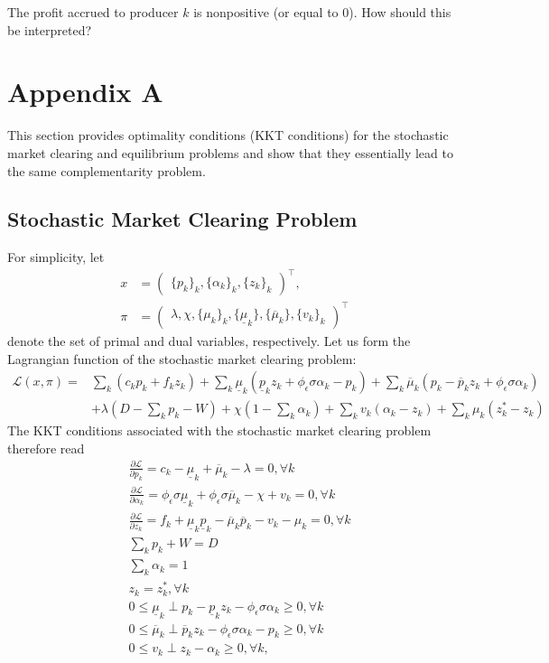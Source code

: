 \documentclass{article}
\begin{document}
The profit accrued to producer $k$ is nonpositive (or equal to 0). How should this be interpreted?

\section{Appendix A}
This section provides optimality conditions (KKT conditions) for the stochastic market clearing and equilibrium problems and show that they essentially lead to the same complementarity problem.
\subsection{Stochastic Market Clearing Problem}
For simplicity, let 
\begin{align*}
x &= \begin{pmatrix} \{p_k\}_k, \{\alpha_k\}_k, \{z_k\}_k \end{pmatrix}^\top,\\
\pi &= \begin{pmatrix} \lambda, \chi, \{\mu_k\}_k, \{\underline{\mu}_k\}, \{\overline{\mu}_k\}, \{v_k\}_k \end{pmatrix}^\top
\end{align*}
denote the set of primal and dual variables, respectively. Let us form the Lagrangian function of the stochastic market clearing problem:
\begin{align*}
\mathcal{L}(x, \pi) =& \sum_k (c_k p_k + f_k z_k) + \sum_k \underline{\mu}_k (\underline{p}_k z_k + \phi_{\epsilon} \sigma \alpha_k - p_k) + \sum_k \overline{\mu}_k (p_k - \overline{p}_k z_k + \phi_{\epsilon} \sigma \alpha_k)\\
& + \lambda(D - \sum_k p_k - W) + \chi(1 - \sum_k \alpha_k) + \sum_k v_k (\alpha_k - z_k) + \sum_k \mu_k(z_k^*- z_k)
\end{align*}
The KKT conditions associated with the stochastic market clearing problem therefore read
\begin{align*}
&\frac{\partial \mathcal{L}}{\partial p_k} = c_k - \underline{\mu}_k + \overline{\mu}_k - \lambda = 0, \forall k\\
&\frac{\partial \mathcal{L}}{\partial \alpha_k} = \phi_{\epsilon} \sigma \underline{\mu}_k + \phi_{\epsilon} \sigma \overline{\mu}_k - \chi + v_k = 0, \forall k\\
&\frac{\partial \mathcal{L}}{\partial z_k} = f_k + \underline{\mu}_k \underline{p}_k - \overline{\mu}_k \overline{p}_k - v_k - \mu_k = 0, \forall k\\
&\sum_k p_k + W = D\\
&\sum_k \alpha_k = 1\\
&z_k = z_k^*, \forall k\\
&0 \le \underline{\mu}_k \perp p_k - \underline{p}_k z_k - \phi_{\epsilon} \sigma \alpha_k \ge 0, \forall k\\
&0 \le \overline{\mu}_k \perp \overline{p}_k z_k - \phi_{\epsilon} \sigma \alpha_k - p_k \ge 0, \forall k\\
&0\le v_k\perp z_k-\alpha_k\ge0, \forall k,
\end{align*}
\end{document}
